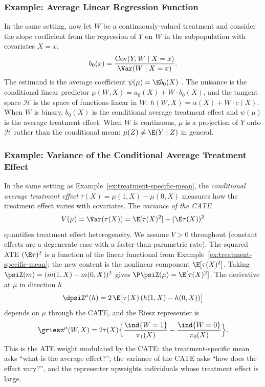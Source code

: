 \documentclass{article}
\DeclareMathOperator{\Cov}{Cov}
\begin{document}
\subsubsection{Example: Average Linear Regression Function}
\label{ex:average-linear-regression}
In the same setting, now let $W$ be a continuously-valued
treatment and consider the slope coefficient from the
regression of $Y$ on $W$ in the subpopulation with
covariates $X = x$,
\begin{equation}\label{eq:cond-slope}
b_0(x) = \frac{\Cov(Y, W \mid X=x)}
              {\Var(W \mid X=x)}.
\end{equation}
The estimand is the average coefficient
$\psi(\mu) = \E b_0(X)$
\citep{graham2022semiparametrically}.
The nuisance is the conditional linear predictor
$\mu(W,X) = a_0(X) + W \cdot b_0(X)$,
and the tangent space $\mathcal{H}$ is the space
of functions linear in $W$:
$h(W,X) = \alpha(X) + W \cdot c(X)$.
When $W$ is binary, $b_0(X)$ is the
conditional average treatment effect
and $\psi(\mu)$ is the average treatment effect.
When $W$ is continuous,
$\mu$ is a projection of $Y$ onto $\mathcal{H}$
rather than the conditional mean:
$\mu(Z) \neq \E(Y \mid Z)$ in general.

\subsubsection{Example: Variance of the Conditional Average Treatment Effect}
\label{ex:vcate}
In the same setting as Example~\ref{ex:treatment-specific-mean},
the \emph{conditional average treatment effect}
$\tau(X) = \mu(1,X) - \mu(0,X)$
measures how the treatment effect varies with covariates.
The \emph{variance of the CATE}
\begin{equation}\label{eq:vcate}
V(\mu) = \Var(\tau(X))
       = \E[\tau(X)^2] - (\E\tau(X))^2
\end{equation}
quantifies treatment effect heterogeneity.
We assume $V > 0$ throughout
(constant effects are a degenerate case
with a faster-than-parametric rate).
The squared ATE $(\E\tau)^2$
is a function of the linear functional
from Example~\ref{ex:treatment-specific-mean};
the new content is the nonlinear component
$\E[\tau(X)^2]$.
Taking $\psiZ(m) = (m(1,X) - m(0,X))^2$
gives $\P\psiZ(\mu) = \E[\tau(X)^2]$.
The derivative at $\mu$ in direction $h$
\begin{equation}\label{eq:vcate-derivative}
\dpsiZ^\mu(h)
  = 2\,\E\bigl[
      \tau(X)\,
      (h(1,X) - h(0,X))
    \bigr]
\end{equation}
depends on $\mu$ through the CATE,
and the Riesz representer is
\begin{equation}\label{eq:vcate-riesz}
\griesz^\mu(W,X)
  = 2\tau(X)
    \qty\Big{\frac{\ind{W=1}}{\pi_1(X)}
         - \frac{\ind{W=0}}{\pi_0(X)}}.
\end{equation}
This is the ATE weight
modulated by the CATE:
the treatment-specific mean asks
``what is the average effect?'';
the variance of the CATE asks
``how does the effect vary?'',
and the representer
upweights individuals
whose treatment effect is large.
\end{document}
